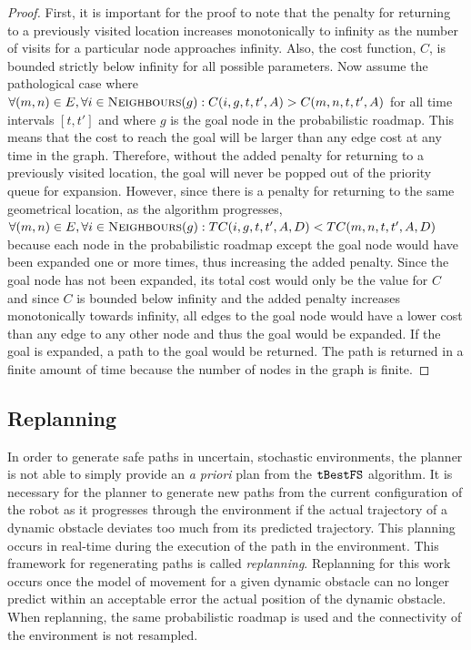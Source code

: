 \begin{proof}

    First, it is important for the proof to note that the penalty for returning
    to a previously visited location increases monotonically to infinity as the
    number of visits for a particular node approaches infinity. Also, the cost
    function, $C$, is bounded strictly below infinity for all possible
    parameters. Now assume the pathological case where $\forall (m, n)
    \in E, \forall i \in \Function{Neighbours}(g) : C(i, g, t, t', A) > C(m, n,
    t, t', A)$ for all time intervals $[t, t']$ and where $g$ is the goal node
    in the probabilistic roadmap. This means that the cost to reach the goal
    will be larger than any edge cost at any time in the graph.  Therefore,
    without the added penalty for returning to a previously visited location,
    the goal will never be popped out of the priority queue for expansion.
    However, since there is a penalty for returning to the same geometrical
    location, as the algorithm progresses, $\forall (m, n)
    \in E, \forall i \in \Function{Neighbours}(g) : TC(i, g, t, t', A, D) <
    TC(m, n, t, t', A, D)$ because each node in the probabilistic roadmap
    except the goal node would have been expanded one or more times, thus
    increasing the added penalty. Since the goal node has not been expanded,
    its total cost would only be the value for $C$ and since $C$ is bounded
    below infinity and the added penalty increases monotonically towards
    infinity, all edges to the goal node would have a lower cost than any edge
    to any other node and thus the goal would be expanded. If the goal is
    expanded, a path to the goal would be returned. The path is returned in a
    finite amount of time because the number of nodes in the graph is finite.

\end{proof}

\subsection{Replanning}

In order to generate safe paths in uncertain, stochastic environments, the
planner is not able to simply provide an \emph{a priori} plan from the
$\Acronym{tBestFS}$ algorithm. It is necessary for the planner to generate new
paths from the current configuration of the robot as it progresses through the
environment if the actual trajectory of a dynamic obstacle deviates too much
from its predicted trajectory. This planning occurs in real-time during the
execution of the path in the environment. This framework for regenerating paths
is called \emph{replanning}. Replanning for this work occurs once the model of
movement for a given dynamic obstacle can no longer predict within an
acceptable error the actual position of the dynamic obstacle. When replanning,
the same probabilistic roadmap is used and the connectivity of the environment
is not resampled.

